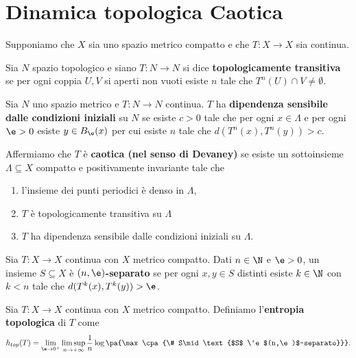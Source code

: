 \chapter{Dinamica topologica Caotica}
Supponiamo che $X$ sia uno spazio metrico compatto e che $T:X\to X$ sia continua.

\begin{definition}
Sia $N$ spazio topologico e siano  $T:N\to N$ si dice \textbf{topologicamente transitiva} se per ogni coppia $U,V$ si aperti non vuoti esiste $n$ tale che $T^n(U)\cap V\neq \emptyset$.
\end{definition}
\begin{definition}
Sia $N$ uno spazio metrico e $T:N\to N$ continua. $T$ ha \textbf{dipendenza sensibile dalle condizioni iniziali} su $N$ se esiste $c>0$ tale che per ogni $x\in \Lambda$ e per ogni $\e>0$ esiste $y\in B_\e(x)$ per cui esiste $n$ tale che $d(T^n(x),T^n(y))>c$.
\end{definition}
\begin{definition}
Affermiamo che $T$ \`e \textbf{caotica (nel senso di Devaney)} se esiste un sottoinsieme $\Lambda\subseteq X$ compatto e positivamente invariante tale che
\begin{enumerate}
\item l'insieme dei punti periodici \`e denso in $\Lambda$,
\item $T$ \`e topologicamente transitiva su $\Lambda$
\item $T$ ha dipendenza sensibile dalle condizioni iniziali su $\Lambda$.
\end{enumerate}
\end{definition}

\begin{definition}
Sia $T:X\to X$ continua con $X$ metrico compatto. Dati $n\in\N$ e $\e>0$, un insieme $S\subseteq X$ \`e \textbf{$(n,\e)$-separato} se per ogni $x,y\in S$ distinti esiste $k\in\N$ con $k<n$ tale che $d(T^k(x),T^k(y))>\e$.
\end{definition}

\begin{definition}
Sia $T:X\to X$ continua con $X$ metrico compatto. Definiamo l'\textbf{entropia topologica} di $T$ come
\[h_{top}(T)=\lim_{\e\to0^+}\limsup_{n\to+\infty}\frac1n\log\pa{\max\cpa{\# S\mid \text{$S$ \`e $(n,\e)$-separato}}}.\]
\end{definition}

